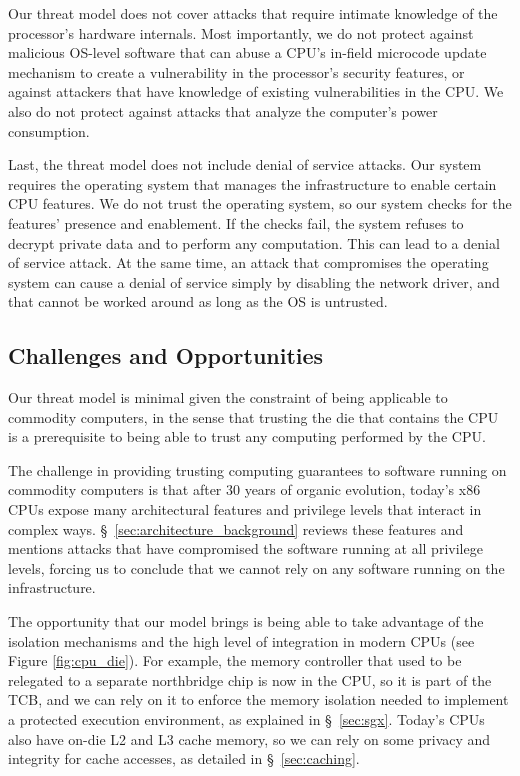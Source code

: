 Our threat model does not cover attacks that require intimate knowledge of the
processor's hardware internals. Most importantly, we do not protect against
malicious OS-level software that can abuse a CPU's in-field microcode update
mechanism to create a vulnerability in the processor's security features, or
against attackers that have knowledge of existing vulnerabilities in the CPU.
We also do not protect against attacks that analyze the computer's power
consumption.

Last, the threat model does not include denial of service attacks. Our system
requires the operating system that manages the infrastructure to enable certain
CPU features. We do not trust the operating system, so our system checks for
the features' presence and enablement. If the checks fail, the system refuses
to decrypt private data and to perform any computation. This can lead to a
denial of service attack. At the same time, an attack that compromises the
operating system can cause a denial of service simply by disabling the network
driver, and that cannot be worked around as long as the OS is untrusted.


\subsection{Challenges and Opportunities}

Our threat model is minimal given the constraint of being applicable to
commodity computers, in the sense that trusting the die that contains the CPU
is a prerequisite to being able to trust any computing performed by the CPU.

The challenge in providing trusting computing guarantees to software running on
commodity computers is that after 30 years of organic evolution, today's x86
CPUs expose many architectural features and privilege levels that interact in
complex ways. \S~\ref{sec:architecture_background} reviews these features and
mentions attacks that have compromised the software running at all privilege
levels, forcing us to conclude that we cannot rely on any software running on
the infrastructure.

The opportunity that our model brings is being able to take advantage of the
isolation mechanisms and the high level of integration in modern CPUs (see
Figure \ref{fig:cpu_die}). For example, the memory controller that used to be
relegated to a separate northbridge chip is now in the CPU, so it is part of
the TCB, and we can rely on it to enforce the memory isolation needed to
implement a protected execution environment, as explained in \S~\ref{sec:sgx}.
Today's CPUs also have on-die L2 and L3 cache memory, so we can rely on some
privacy and integrity for cache accesses, as detailed in \S~\ref{sec:caching}.

